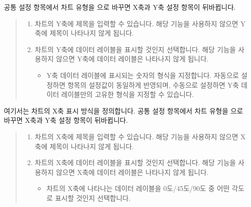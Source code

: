 \documentclass[letterpaper,10pt,english]{sphinxmanual}
\begin{document}
공통 설정 항목에서 차트 유형을 으로 바꾸면 X축과 Y축 설정 항목이 뒤바뀝니다.
\begin{quote}

\begin{figure}[H]
\centering

\noindent{}
\end{figure}
\begin{enumerate}
\def\theenumi{\arabic{enumi}}
\def\labelenumi{\theenumi .}
\makeatletter\def\p@enumii{\p@enumi \theenumi .}\makeatother
\item {} 
 차트의 Y축에 제목을 입력할 수 있습니다. 해당 기능을 사용하지 않으면 Y축에 제목이 나타나지 않게 됩니다.

\item {} 
 차트의 Y축에 데이터 레이블을 표시할 것인지 선택합니다. 해당 기능을 사용하지 않으면 Y축에 데이터 레이블은 나타나지 않게 됩니다.
\begin{itemize}
\item {} 
 Y축 데이터 레이블에 표시되는 숫자의 형식을 지정합니다. 자동으로 설정하면  항목의 설정값이 동일하게 반영되며, 수동으로 설정하면 Y축 데이터 레이블만의 고유한 형식을 지정할 수 있습니다.

\end{itemize}

\end{enumerate}
\end{quote}


여기서는 차트의 X축 표시 방식을 정의합니다. 공통 설정 항목에서 차트 유형을 으로 바꾸면 X축과 Y축 설정 항목이 뒤바뀝니다.
\begin{quote}

\begin{figure}[H]
\centering

\noindent{}
\end{figure}
\begin{enumerate}
\def\theenumi{\arabic{enumi}}
\def\labelenumi{\theenumi .}
\makeatletter\def\p@enumii{\p@enumi \theenumi .}\makeatother
\item {} 
 차트의 X축에 제목을 입력할 수 있습니다. 해당 기능을 사용하지 않으면 X축에 제목이 나타나지 않게 됩니다.

\item {} 
 차트의 X축에 데이터 레이블을 표시할 것인지 선택합니다. 해당 기능을 사용하지 않으면 X축에 데이터 레이블은 나타나지 않게 됩니다.
\begin{itemize}
\item {} 
 차트의 X축에 나타나는 데이터 레이블을 0도/45도/90도 중 어떤 각도로 표시할 것인지 선택합니다.

\end{itemize}

\end{enumerate}
\end{quote}
\end{document}
